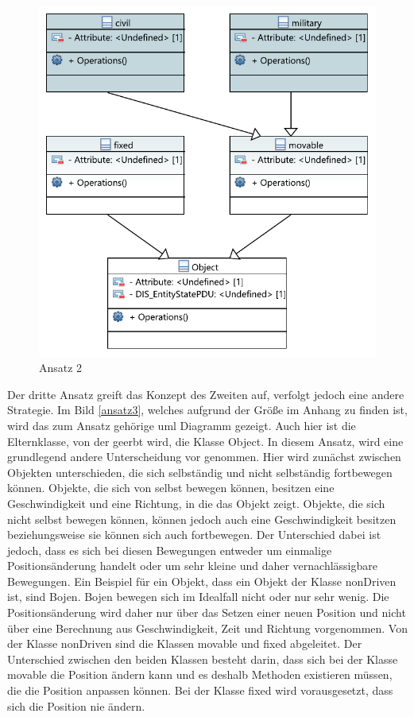 \begin{figure}[H]
	\centering
	\includegraphics[scale=0.9]{bilder/pdfvorlagen/ansatz1}
	\caption[Ansatz 2]{Ansatz 2}
	\label{ansatz2}
\end{figure}
Der dritte Ansatz greift das Konzept des Zweiten auf, verfolgt jedoch eine andere Strategie. Im Bild \ref{ansatz3}, welches aufgrund der Größe im Anhang zu finden ist, wird das zum Ansatz gehörige \ac{uml} Diagramm gezeigt. Auch hier ist die Elternklasse, von der geerbt wird, die Klasse \glqq Object\grqq{}. In diesem Ansatz, wird eine grundlegend andere Unterscheidung vor genommen. Hier wird zunächst zwischen Objekten unterschieden, die sich selbständig und nicht selbständig fortbewegen können. Objekte, die sich von selbst bewegen können,  besitzen eine Geschwindigkeit und eine Richtung, in die das Objekt zeigt. Objekte, die sich nicht selbst bewegen können, können jedoch auch eine Geschwindigkeit besitzen beziehungsweise sie können sich auch fortbewegen. Der Unterschied dabei ist jedoch, dass es sich bei diesen Bewegungen entweder um einmalige Positionsänderung handelt oder um sehr kleine und daher vernachlässigbare Bewegungen. Ein Beispiel für ein Objekt, dass ein Objekt der Klasse \glqq nonDriven\grqq{} ist, sind Bojen. Bojen bewegen sich im Idealfall nicht oder nur sehr wenig. Die Positionsänderung wird daher nur über das Setzen einer neuen Position und nicht über eine Berechnung aus Geschwindigkeit, Zeit und Richtung vorgenommen. Von der Klasse  \glqq nonDriven\grqq{} sind die Klassen \glqq movable\grqq{} und   \glqq fixed\grqq{} abgeleitet. Der Unterschied zwischen den beiden Klassen besteht darin, dass sich bei der Klasse  \glqq movable\grqq{} die Position ändern kann und es deshalb Methoden existieren müssen, die die Position anpassen können. Bei der Klasse \glqq fixed\grqq{} wird vorausgesetzt, dass sich die Position nie ändern.\\

